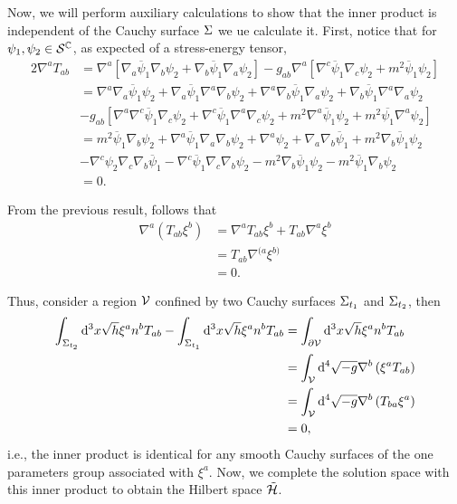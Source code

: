 Now, we will perform auxiliary calculations to show that the inner product is independent of the Cauchy surface \(\Sigma\) we ue calculate it. First, notice that for \(\psi_1,\psi_2\in{\mathcal{S}}^{\mathbb{C}}\), as expected of a stress-energy tensor,
\begin{subequations}
    \begin{align}
        2\nabla^aT_{ab}&=\nabla^a\left[\nabla_a\overline{\psi}_1\nabla_b\psi_2+\nabla_b\overline{\psi}_1\nabla_a\psi_2\right]-g_{ab}\nabla^a\left[\nabla^c\overline{\psi}_1\nabla_c\psi_2+m^2\overline{\psi}_1\psi_2\right]\\
        &=\nabla^a\nabla_a\overline{\psi}_1\psi_2+\nabla_ a\overline{\psi}_1\nabla^a\nabla_b\psi_2+\nabla^a\nabla_b\overline{\psi}_1\nabla_a\psi_2+\nabla_b\overline{\psi}_1\nabla^a\nabla_a\psi_2\\
        &-g_{ab}\left[\nabla^a\nabla^c\overline{\psi}_1\nabla_c\psi_2+\nabla^c\overline{\psi}_1\nabla^a\nabla_c\psi_2+m^2\nabla^a\overline{\psi}_1\psi_2+m^2\overline{\psi_1}\nabla^a\psi_2\right]\\
        &=m^2\overline{\psi}_1\nabla_b\psi_2+\nabla^a\overline{\psi}_1\nabla_a\nabla_b\psi_2+\nabla^a\psi_2+\nabla_a\nabla_b\overline{\psi}_1+m^2\nabla_b\overline{\psi}_1\psi_2\\
        &-\nabla^c\psi_2\nabla_c\nabla_b\overline{\psi}_1-\nabla^c\overline{\psi}_1\nabla_c\nabla_b\psi_2-m^2\nabla_b\overline{\psi}_1\psi_2-m^2\overline{\psi}_1\nabla_b\psi_2\\
        &=0.
    \end{align}
\end{subequations}

From the previous result, follows that
\begin{subequations}
    \begin{align}
        \nabla^a\left(T_{ab}\xi^b\right)&=\nabla^aT_{ab}\xi^b+T_{ab}\nabla^a\xi^b\\
        &=T_{ab}\nabla^{(a}\xi^{b)}\\
        &=0.
    \end{align}
\end{subequations}

Thus, consider a region \({\mathcal{V}}\) confined by two Cauchy surfaces \(\Sigma_{t_1}\) and \(\Sigma_{t_2}\), then
\begin{subequations}
    \begin{align}
        \int_{\Sigma_{t_2}}\mathrm{d}^3x\sqrt{h}\xi^an^bT_{ab}-\int_{\Sigma_{t_1}}\mathrm{d}^3x\sqrt{h}\xi^an^bT_{ab}&=\int_{\partial{\mathcal{V}}}\mathrm{d}^3x\sqrt{h}\xi^an^bT_{ab}\\
        &=\int_{\mathcal{V}}\mathrm{d}^4\sqrt{-g}\nabla^b\left(\xi^aT_{ab}\right)\\
        &=\int_{\mathcal{V}}\mathrm{d}^4\sqrt{-g}\nabla^b\left(T_{ba}\xi^a\right)\\
        &=0,
    \end{align}
\end{subequations}
i.e., the inner product is identical for any smooth Cauchy surfaces of the one parameters group associated with \(\xi^a\). Now, we complete the solution space with this inner product to obtain the Hilbert space \(\tilde{{\mathcal{H}}}\).

